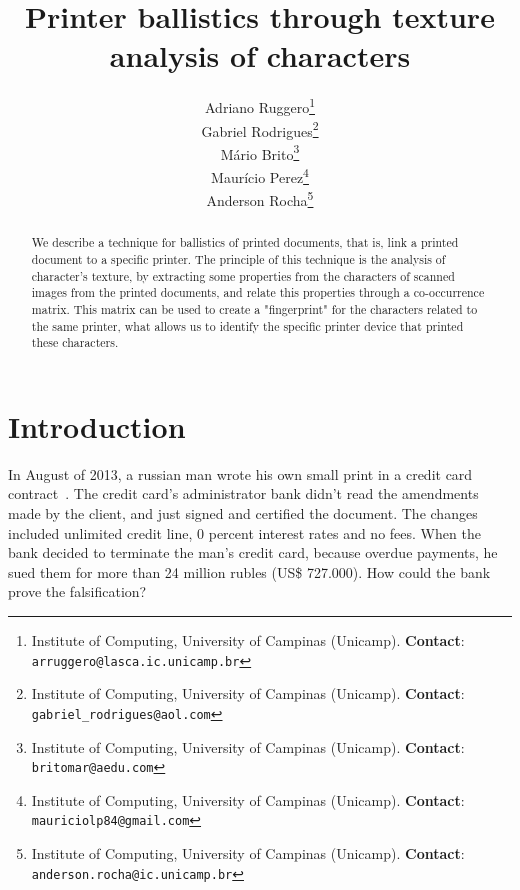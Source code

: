\documentclass[10pt,twocolumn,letterpaper]{article}
\begin{document}
\title{Printer ballistics through texture analysis of characters}
\author{Adriano Ruggero\thanks{Institute of Computing, University of Campinas (Unicamp). \textbf{Contact}: \tt\small{arruggero@lasca.ic.unicamp.br}}\\
Gabriel Rodrigues\thanks{Institute of Computing, University of Campinas (Unicamp). \textbf{Contact}: \tt\small{gabriel\_rodrigues@aol.com}}\\
Mário Brito\thanks{Institute of Computing, University of Campinas (Unicamp). \textbf{Contact}:
\tt\small{britomar@aedu.com}}\\
Maurício Perez\thanks{Institute of Computing, University of Campinas (Unicamp). \textbf{Contact}:
\tt\small{mauriciolp84@gmail.com}}\\
Anderson Rocha\thanks{Institute of Computing, University of Campinas (Unicamp). \textbf{Contact}: \tt\small{anderson.rocha@ic.unicamp.br}}
}

\maketitle
\begin{abstract}
We describe a technique for ballistics of printed documents, that is, link a printed document to a specific printer. The principle of this technique is the analysis of character's texture, by extracting some properties from the characters of scanned images from the printed documents, and relate this properties through a co-occurrence matrix. This matrix can be used to create a "fingerprint" for the characters related to the same printer, what allows us to identify the specific printer device that printed these characters.
\end{abstract}

\section{Introduction}
\label{sec:introduction}

In August of 2013, a russian man wrote his own small print in a credit card contract~\cite{RT}. The credit card's administrator bank didn't read the amendments made by the client, and just signed and certified the document. The changes included unlimited credit line, 0 percent interest rates and no fees. When the bank decided to terminate the man's credit card, because overdue payments, he sued them for more than 24 million rubles (US\$ 727.000). How could the bank prove the falsification?
\end{document}
